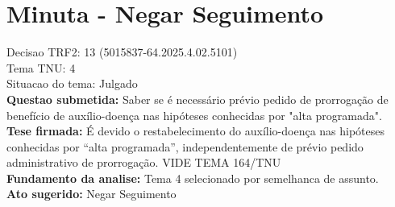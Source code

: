 \documentclass{article}
\begin{document}
\section*{Minuta - Negar Seguimento}
Decisao TRF2: 13 (5015837-64.2025.4.02.5101)\\
Tema TNU: 4\\
Situacao do tema: Julgado\\
\textbf{Questao submetida:} Saber se é necessário prévio pedido de prorrogação de benefício de auxílio-doença nas hipóteses conhecidas por "alta programada".\\
\textbf{Tese firmada:} É devido o restabelecimento do auxílio-doença nas hipóteses conhecidas por “alta programada”, independentemente de prévio pedido administrativo de prorrogação. VIDE TEMA 164/TNU\\
\textbf{Fundamento da analise:} Tema 4 selecionado por semelhanca de assunto.\\
\textbf{Ato sugerido:} Negar Seguimento
\end{document}

